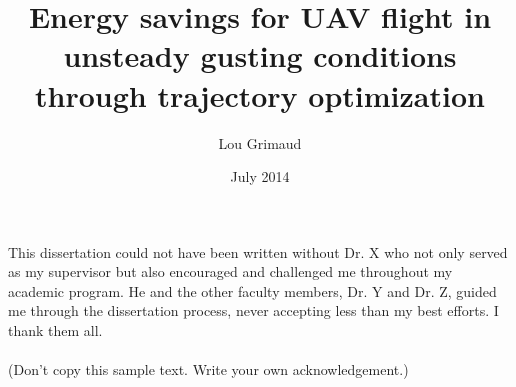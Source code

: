 \documentclass{iitthesis}
\begin{document}
\title{Energy savings for UAV flight in unsteady gusting conditions \\
  through trajectory optimization }
\author{Lou Grimaud}
\date{July 2014}
\maketitle                %


\prelimpages         %


\begin{acknowledgement}     %
  \par  This dissertation could not have been written without Dr. X
  who not only served as my supervisor but also encouraged and
  challenged me throughout my academic program. He and the other
  faculty members, Dr. Y and Dr. Z, guided me through the
  dissertation process, never accepting less than my best efforts. I
  thank them all.\\ \\ (Don't copy this sample text. Write your own
  acknowledgement.)
\end{acknowledgement}


\tableofcontents
\clearpage

\listoftables

\clearpage

\listoffigures

\clearpage


\listofsymbols
\end{document}
